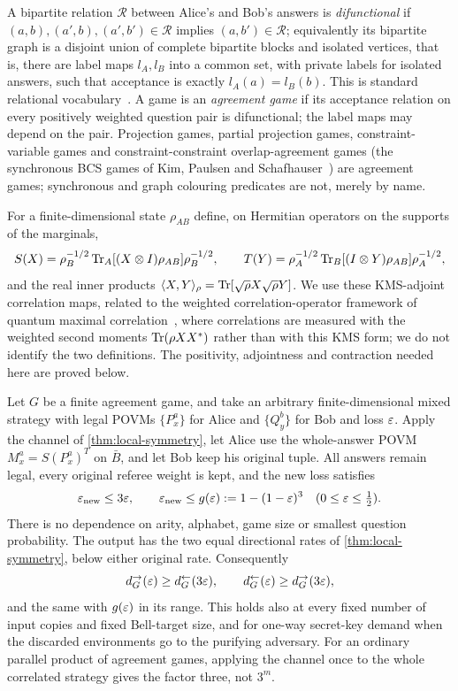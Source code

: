 A bipartite relation $\mathcal R$ between Alice's and Bob's answers is \emph{difunctional} if
$(a,b),\allowbreak(a',b),\allowbreak(a',b')\in\mathcal R$ implies $(a,b')\in\mathcal R$; equivalently its bipartite graph is a disjoint union of complete bipartite blocks and isolated
vertices, that is, there are label maps $l_A,l_B$ into a common set, with private labels for isolated answers, such that
acceptance is exactly $l_A(a)=l_B(b)$. This is standard relational vocabulary~\cite{Rig48,HT15}. A game is an
\emph{agreement game} if its acceptance relation on every positively weighted question pair is difunctional; the label maps
may depend on the pair. Projection games, partial projection games,
constraint-variable games and constraint-constraint overlap-agreement games (the synchronous BCS games of Kim, Paulsen and
Schafhauser~\cite[Def.~4.2]{KPS18}) are agreement games; synchronous and graph colouring predicates are not, merely by
name.

For a finite-dimensional state $\rho_{AB}$ define, on Hermitian operators on the supports of the marginals,
\[
S(X)=\rho_B^{-1/2}\operatorname{Tr}_A[(X\otimes I)\rho_{AB}]\rho_B^{-1/2},\qquad T(Y)=\rho_A^{-1/2}\operatorname{Tr}_B[(I\otimes Y)\rho_{AB}]\rho_A^{-1/2},
\]
and the real inner products $\langle X,Y\rangle_\rho=\operatorname{Tr}[\sqrt\rho X\sqrt\rho Y]$. We use these KMS-adjoint correlation maps, related to
the weighted correlation-operator framework of quantum maximal correlation~\cite{Bei13}, where correlations are measured with the
weighted second moments $\operatorname{Tr}(\rho XX^*)$ rather than with this KMS form; we do not identify the two definitions. The positivity,
adjointness and contraction needed here are proved below.

\begin{theorem}\label{thm:factor-three}
Let $G$ be a finite agreement game, and take an arbitrary finite-dimensional mixed strategy with legal POVMs $\{P_x^a\}$
for Alice and $\{Q_y^b\}$ for Bob and loss $\varepsilon$. Apply the channel of \cref{thm:local-symmetry}, let Alice use the
whole-answer POVM $M_x^a=S(P_x^a)^T$ on $\bar B$, and let Bob keep his original tuple. All answers remain legal, every
original referee weight is kept, and the new loss satisfies
\[
\varepsilon_{\mathrm{new}}\le3\varepsilon,\qquad\varepsilon_{\mathrm{new}}\le g(\varepsilon):=1-(1-\varepsilon)^3\quad(0\le\varepsilon\le\tfrac12).
\]
There is no dependence on arity, alphabet, game size or smallest question probability. The output has the two equal
directional rates of \cref{thm:local-symmetry}, below either original rate. Consequently
\[
d_G^\to(\varepsilon)\ge d_G^\leftarrow(3\varepsilon),\qquad d_G^\leftarrow(\varepsilon)\ge d_G^\to(3\varepsilon),
\]
and the same with $g(\varepsilon)$ in its range. This holds also at every fixed number of input copies and fixed Bell-target size,
and for one-way secret-key demand when the discarded environments go to the purifying adversary. For an ordinary parallel
product of agreement games, applying the channel once to the whole correlated strategy gives the factor three, not
$3^m$.
\end{theorem}

